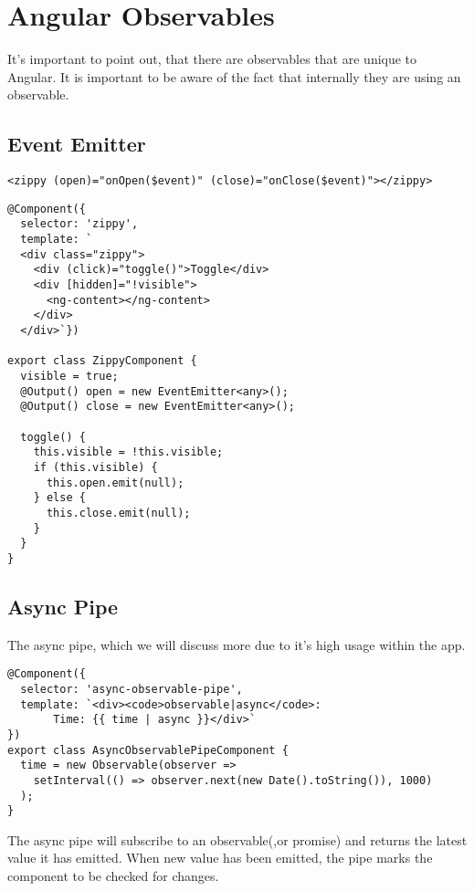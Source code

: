 \maketitle{}
\section{ Angular Observables }
It's important to point out, that there are observables that are unique to 
Angular. It is important to be aware of the fact that internally they are 
using an observable. 

\subsection{ Event Emitter }

\begin{lstlisting}
<zippy (open)="onOpen($event)" (close)="onClose($event)"></zippy>
\end{lstlisting}

\begin{lstlisting}
@Component({
  selector: 'zippy',
  template: `
  <div class="zippy">
    <div (click)="toggle()">Toggle</div>
    <div [hidden]="!visible">
      <ng-content></ng-content>
    </div>
  </div>`})

export class ZippyComponent {
  visible = true;
  @Output() open = new EventEmitter<any>();
  @Output() close = new EventEmitter<any>();

  toggle() {
    this.visible = !this.visible;
    if (this.visible) {
      this.open.emit(null);
    } else {
      this.close.emit(null);
    }
  }
}
\end{lstlisting}

\subsection{ Async Pipe }
The async pipe, which we will discuss more due to it's high usage within the
app. 

\begin{lstlisting}
@Component({
  selector: 'async-observable-pipe',
  template: `<div><code>observable|async</code>:
       Time: {{ time | async }}</div>`
})
export class AsyncObservablePipeComponent {
  time = new Observable(observer =>
    setInterval(() => observer.next(new Date().toString()), 1000)
  );
}
\end{lstlisting}

The async pipe will subscribe to an observable(,or promise) and returns the 
latest value it has emitted. When new value has been emitted, the pipe marks 
the component to be checked for changes. 

